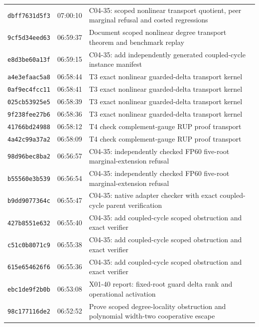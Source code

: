 \documentclass[11pt]{article}
\theoremstyle{remark}
\begin{document}
\begin{longtable}{lll}
\texttt{dbff7631d5f3} & 07:00:10 & {\footnotesize C04-35: scoped nonlinear transport quotient, peer marginal refusal and costed regressions}\\
\texttt{9cf5d34eed63} & 06:59:37 & {\footnotesize Document scoped nonlinear degree transport theorem and benchmark replay}\\
\texttt{e8d3be60a13f} & 06:59:15 & {\footnotesize C04-35: add independently generated coupled-cycle instance manifest}\\
\texttt{a4e3efaac5a8} & 06:58:44 & {\footnotesize T3 exact nonlinear guarded-delta transport kernel}\\
\texttt{0af9ec4fcc11} & 06:58:41 & {\footnotesize T3 exact nonlinear guarded-delta transport kernel}\\
\texttt{025cb53925e5} & 06:58:39 & {\footnotesize T3 exact nonlinear guarded-delta transport kernel}\\
\texttt{9f238fee27b6} & 06:58:36 & {\footnotesize T3 exact nonlinear guarded-delta transport kernel}\\
\texttt{41766bd24988} & 06:58:12 & {\footnotesize T4 check complement-gauge RUP proof transport}\\
\texttt{4a42c99a37a2} & 06:58:09 & {\footnotesize T4 check complement-gauge RUP proof transport}\\
\texttt{98d96bec8ba2} & 06:56:57 & {\footnotesize C04-35: independently checked FP60 five-root marginal-extension refusal}\\
\texttt{b55560e3b539} & 06:56:54 & {\footnotesize C04-35: independently checked FP60 five-root marginal-extension refusal}\\
\texttt{b9dd9077364c} & 06:55:47 & {\footnotesize C04-35: native adapter checker with exact coupled-cycle parent verification}\\
\texttt{427b8551e632} & 06:55:40 & {\footnotesize C04-35: add coupled-cycle scoped obstruction and exact verifier}\\
\texttt{c51c0b8071c9} & 06:55:38 & {\footnotesize C04-35: add coupled-cycle scoped obstruction and exact verifier}\\
\texttt{615e654626f6} & 06:55:36 & {\footnotesize C04-35: add coupled-cycle scoped obstruction and exact verifier}\\
\texttt{ebc1de9f2b0b} & 06:53:08 & {\footnotesize X01-40 report: fixed-root guard delta rank and operational activation}\\
\texttt{98c177116de2} & 06:52:52 & {\footnotesize Prove scoped degree-locality obstruction and polynomial width-two cooperative escape}\\

\end{longtable}
\end{document}
